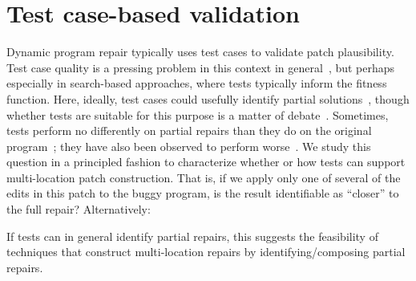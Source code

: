 \documentclass[10pt, conference]{IEEEtran}
\begin{document}
\section{Test case-based validation}
\label{sec:tests}

Dynamic program repair typically uses test cases to validate patch plausibility. 
%
Test case quality is a pressing problem in this context in
general~\cite{Smith15fse}, but perhaps especially in search-based approaches,
where tests typically inform the fitness
function. Here, ideally, test cases could usefully identify partial
solutions~\cite{better-fitness}, 
though whether tests are suitable for this purpose is a matter of
debate~\cite{ae,rsrepair}.  Sometimes, tests perform no differently on partial
repairs than they do on the original program~\cite{chris-thesis,
  source-code-checkpoint}; they have also been observed to perform
worse~\cite{gecco09}.  
%
We study this question in a principled fashion to characterize whether or how
tests can support multi-location patch construction.  That is, if we apply only one of
several of the edits in this patch to the buggy program, is the result
identifiable as ``closer'' to the full repair? Alternatively:


If tests can in general identify partial repairs, this suggests the feasibility
of techniques that construct multi-location repairs by identifying/composing
partial repairs.

\end{document}

